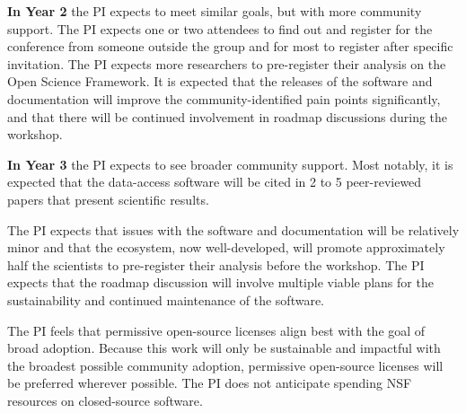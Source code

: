 \documentclass[11pt,oneside]{memoir}
\begin{document}
\textbf{In Year 2}
the PI expects to meet similar goals, but with more community support.  The PI expects one or two attendees to find out and register for the conference from someone outside the group and for most to register after specific invitation.  The PI expects more researchers to pre-register their analysis on the Open Science Framework.  It is expected that the releases of the software and documentation will improve the community-identified pain points significantly, and that there will be continued involvement in roadmap discussions during the workshop.

\textbf{In Year 3}
the PI expects to see broader community support.  Most notably, it is expected that the data-access software will be cited in 2 to 5 peer-reviewed papers that present scientific results.

The PI expects that issues with the software and documentation will be relatively minor and that the ecosystem, now well-developed, will promote approximately half the scientists to pre-register their analysis before the workshop.  The PI expects that the roadmap discussion will involve multiple viable plans for the sustainability and continued maintenance of the software. 

The PI feels that permissive open-source licenses align best with the goal of broad adoption.  Because this work will only be sustainable and impactful with the broadest possible community adoption, permissive open-source licenses will be preferred wherever possible.  The PI does not anticipate spending NSF resources on closed-source software.
\end{document}
